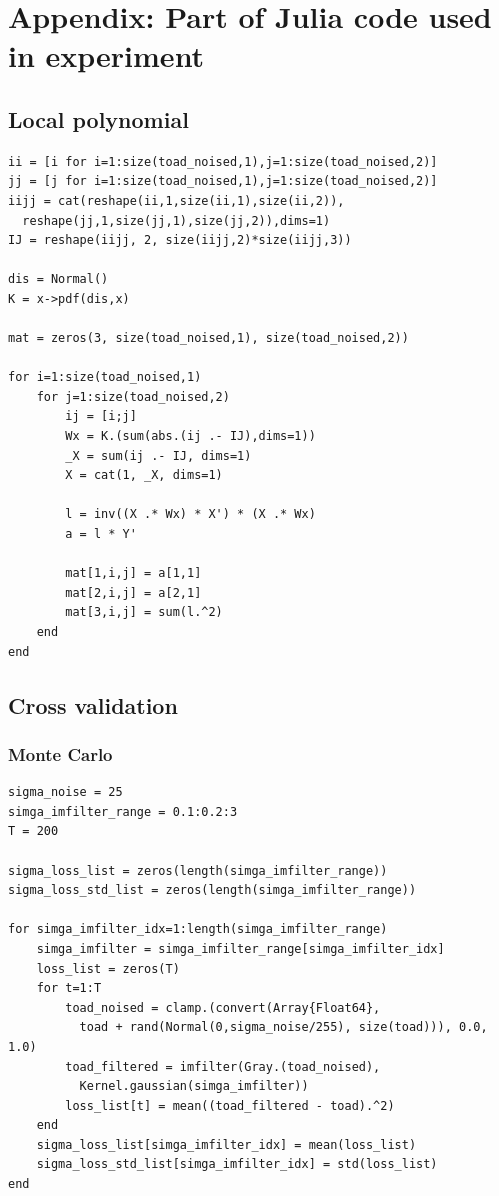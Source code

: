 \documentclass{article}
\begin{document}
  

\appendix

\section{Appendix: Part of Julia code used in experiment}



\subsection{Local polynomial}

\begin{lstlisting}
ii = [i for i=1:size(toad_noised,1),j=1:size(toad_noised,2)] 
jj = [j for i=1:size(toad_noised,1),j=1:size(toad_noised,2)] 
iijj = cat(reshape(ii,1,size(ii,1),size(ii,2)),
  reshape(jj,1,size(jj,1),size(jj,2)),dims=1)
IJ = reshape(iijj, 2, size(iijj,2)*size(iijj,3))

dis = Normal()
K = x->pdf(dis,x)

mat = zeros(3, size(toad_noised,1), size(toad_noised,2))

for i=1:size(toad_noised,1)
    for j=1:size(toad_noised,2)
        ij = [i;j]
        Wx = K.(sum(abs.(ij .- IJ),dims=1))
        _X = sum(ij .- IJ, dims=1)
        X = cat(1, _X, dims=1)

        l = inv((X .* Wx) * X') * (X .* Wx)
        a = l * Y'

        mat[1,i,j] = a[1,1]
        mat[2,i,j] = a[2,1]
        mat[3,i,j] = sum(l.^2)
    end
end
\end{lstlisting}

\subsection{Cross validation}

\subsubsection{Monte Carlo}

\begin{lstlisting}
sigma_noise = 25
simga_imfilter_range = 0.1:0.2:3
T = 200

sigma_loss_list = zeros(length(simga_imfilter_range))
sigma_loss_std_list = zeros(length(simga_imfilter_range))

for simga_imfilter_idx=1:length(simga_imfilter_range)
    simga_imfilter = simga_imfilter_range[simga_imfilter_idx]
    loss_list = zeros(T)
    for t=1:T
        toad_noised = clamp.(convert(Array{Float64}, 
          toad + rand(Normal(0,sigma_noise/255), size(toad))), 0.0, 1.0)
        toad_filtered = imfilter(Gray.(toad_noised), 
          Kernel.gaussian(simga_imfilter))
        loss_list[t] = mean((toad_filtered - toad).^2)
    end
    sigma_loss_list[simga_imfilter_idx] = mean(loss_list)
    sigma_loss_std_list[simga_imfilter_idx] = std(loss_list)
end
\end{lstlisting}
\end{document}
